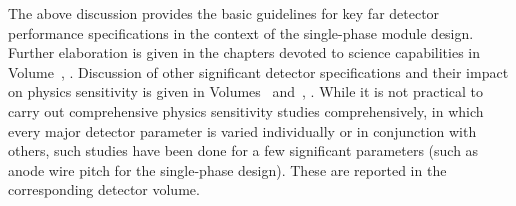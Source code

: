 The above discussion provides the basic guidelines for key far 
detector performance specifications in the context of the 
single-phase module design.  Further elaboration is given in the 
chapters devoted to science capabilities in 
Volume~\volnumberphysics{}, \voltitlephysics{}.
Discussion of other significant detector specifications 
and their impact on 
physics sensitivity is given in Volumes~\volnumbersp{} and~\volnumberdp{}, \voltitledp{}.  While it is not practical to carry out 
comprehensive physics sensitivity studies comprehensively, in 
which every major detector parameter is varied individually or 
in conjunction with others, such studies have been done 
for a few significant parameters (such as anode wire pitch for 
the single-phase \lartpc design).  These are reported in the 
corresponding detector volume.



